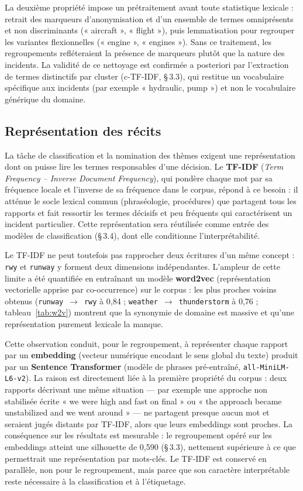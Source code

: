 \documentclass[11pt,a4paper]{article}
\begin{document}
La deuxième propriété impose un prétraitement avant toute statistique lexicale : retrait des
marqueurs d'anonymisation et d'un ensemble de termes omniprésents et non discriminants
(« aircraft », « flight »), puis lemmatisation pour regrouper les variantes flexionnelles
(« engine », « engines »). Sans ce traitement, les regroupements refléteraient la présence de
marqueurs plutôt que la nature des incidents. La validité de ce nettoyage est confirmée a
posteriori par l'extraction de termes distinctifs par cluster (c-TF-IDF, \S\,3.3), qui
restitue un vocabulaire spécifique aux incidents (par exemple « hydraulic, pump ») et non le
vocabulaire générique du domaine.

\subsection{Représentation des récits}
La tâche de classification et la nomination des thèmes exigent une représentation dont on
puisse lire les termes responsables d'une décision. Le \textbf{TF-IDF} (\emph{Term Frequency –
Inverse Document Frequency}), qui pondère chaque mot par sa fréquence locale et l'inverse de
sa fréquence dans le corpus, répond à ce besoin : il atténue le socle lexical commun
(phraséologie, procédures) que partagent tous les rapports et fait ressortir les termes
décisifs et peu fréquents qui caractérisent un incident particulier. Cette représentation
sera réutilisée comme entrée des modèles de classification (\S\,3.4), dont elle conditionne
l'interprétabilité.

Le TF-IDF ne peut toutefois pas rapprocher deux écritures d'un même concept : \texttt{rwy} et
\texttt{runway} y forment deux dimensions indépendantes. L'ampleur de cette limite a été
quantifiée en entraînant un modèle \textbf{word2vec} (représentation vectorielle apprise par
co-occurrence) sur le corpus : les plus proches voisins obtenus
(\texttt{runway}~$\to$~\texttt{rwy} à 0,84 ; \texttt{weather}~$\to$~\texttt{thunderstorm} à
0,76 ; tableau~\ref{tab:w2v}) montrent que la synonymie de domaine est massive et qu'une
représentation purement lexicale la manque.

Cette observation conduit, pour le regroupement, à représenter chaque rapport par un
\textbf{embedding} (vecteur numérique encodant le sens global du texte) produit par un
\textbf{Sentence Transformer} (modèle de phrases pré-entraîné, \texttt{all-MiniLM-L6-v2}). La
raison est directement liée à la première propriété du corpus : deux rapports décrivant une
même situation — par exemple une approche non stabilisée écrite « we were high and fast on
final » ou « the approach became unstabilized and we went around » — ne partagent presque
aucun mot et seraient jugés distants par TF-IDF, alors que leurs embeddings sont proches. La
conséquence sur les résultats est mesurable : le regroupement opéré sur les embeddings atteint
une silhouette de 0,590 (\S\,3.3), nettement supérieure à ce que permettrait une
représentation par mots-clés. Le TF-IDF est conservé en parallèle, non pour le regroupement,
mais parce que son caractère interprétable reste nécessaire à la classification et à
l'étiquetage.
\end{document}
